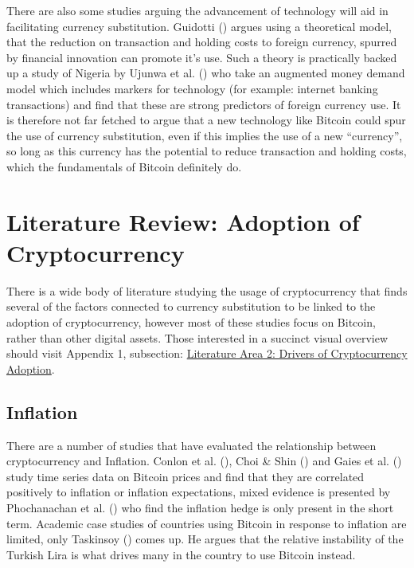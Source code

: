 \documentclass[
]{article}
\begin{document}
There are also some studies arguing the advancement of technology will aid in facilitating currency substitution. Guidotti () argues using a theoretical model, that the reduction on transaction and holding costs to foreign currency, spurred by financial innovation can promote it's use. Such a theory is practically backed up a study of Nigeria by Ujunwa et al. () who take an augmented money demand model which includes markers for technology (for example: internet banking transactions) and find that these are strong predictors of foreign currency use. It is therefore not far fetched to argue that a new technology like Bitcoin could spur the use of currency substitution, even if this implies the use of a new ``currency'', so long as this currency has the potential to reduce transaction and holding costs, which the fundamentals of Bitcoin definitely do.

\newpage

\section{Literature Review: Adoption of Cryptocurrency}\label{literature-review-adoption-of-cryptocurrency}

There is a wide body of literature studying the usage of cryptocurrency that finds several of the factors connected to currency substitution to be linked to the adoption of cryptocurrency, however most of these studies focus on Bitcoin, rather than other digital assets. Those interested in a succinct visual overview should visit Appendix 1, subsection: \hyperref[literature-area-2-drivers-of-cryptocurrency-adoption]{Literature Area 2: Drivers of Cryptocurrency Adoption}.

\subsection{Inflation}\label{inflation-1}

There are a number of studies that have evaluated the relationship between cryptocurrency and Inflation. Conlon et al. (), Choi \& Shin () and Gaies et al. () study time series data on Bitcoin prices and find that they are correlated positively to inflation or inflation expectations, mixed evidence is presented by Phochanachan et al. () who find the inflation hedge is only present in the short term. Academic case studies of countries using Bitcoin in response to inflation are limited, only Taskinsoy () comes up. He argues that the relative instability of the Turkish Lira is what drives many in the country to use Bitcoin instead.
\end{document}
